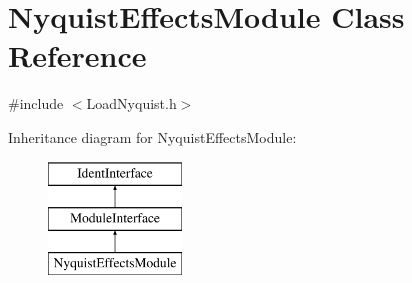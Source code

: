 \hypertarget{class_nyquist_effects_module}{}\section{Nyquist\+Effects\+Module Class Reference}
\label{class_nyquist_effects_module}


{\ttfamily \#include $<$Load\+Nyquist.\+h$>$}

Inheritance diagram for Nyquist\+Effects\+Module\+:\begin{figure}[H]
\begin{center}
\leavevmode
\includegraphics[height=3.000000cm]{class_nyquist_effects_module}
\end{center}
\end{figure}
